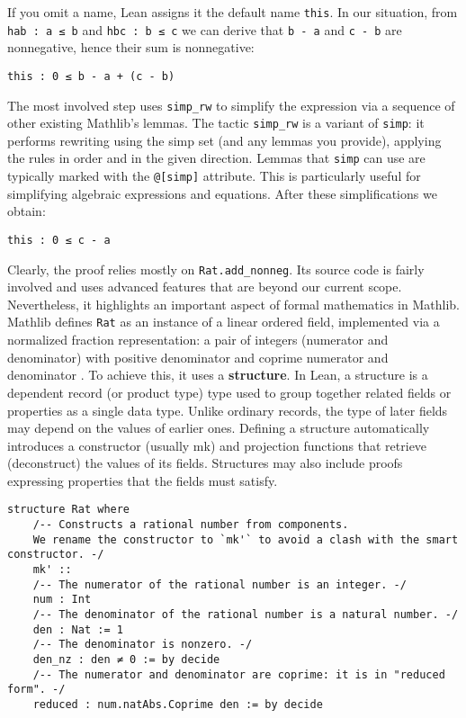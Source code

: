 If you omit a name, Lean assigns it the default name \lstinline[language=lean]|this|.
In our situation, from \lstinline[language=lean]|hab : a ≤ b| and \lstinline[language=lean]|hbc : b ≤ c|
we can derive that \lstinline[language=lean]|b - a| and \lstinline[language=lean]|c - b|
are nonnegative, hence their sum is nonnegative:
\begin{lstlisting}[language=lean]
  this : 0 ≤ b - a + (c - b)
\end{lstlisting}
The most involved step uses \lstinline[language=lean]|simp_rw| to
simplify the expression via a sequence of other existing Mathlib's lemmas.
The tactic \lstinline[language=lean]|simp_rw| is a variant of \lstinline[language=lean]|simp|:
it performs rewriting using the simp set (and any lemmas you provide), applying the rules
in order and in the given direction. Lemmas that \lstinline[language=lean]|simp| can use
are typically marked with the \lstinline[language=lean]|@[simp]| attribute.
This is particularly useful for simplifying algebraic expressions and equations.
After these simplifications we obtain:
\begin{lstlisting}[language=lean]
  this : 0 ≤ c - a
\end{lstlisting}
Clearly, the proof relies mostly on \lstinline[language=lean]|Rat.add_nonneg|.
Its source code is fairly involved and uses advanced features
that are beyond our current scope. Nevertheless, it highlights
an important aspect of formal mathematics in Mathlib.
Mathlib defines \lstinline[language=lean]|Rat| as an instance of
a linear ordered field, implemented via a normalized fraction
representation: a pair of integers (numerator and denominator)
with positive denominator and coprime numerator and denominator \cite{mathlibdoc}.
To achieve this, it uses a \textbf{structure}. In Lean, a structure is a dependent record
(or product type) type  used to group together related fields or properties as a single data type.
Unlike ordinary records, the type of later fields may depend on the values of earlier ones.
Defining a structure automatically introduces a constructor (usually mk) and projection
functions that retrieve (deconstruct) the values of its fields.
Structures may also include proofs expressing properties that the fields must satisfy.
\newpage
\begin{lstlisting}[language=lean]
  structure Rat where
    /-- Constructs a rational number from components.
    We rename the constructor to `mk'` to avoid a clash with the smart constructor. -/
    mk' ::
    /-- The numerator of the rational number is an integer. -/
    num : Int
    /-- The denominator of the rational number is a natural number. -/
    den : Nat := 1
    /-- The denominator is nonzero. -/
    den_nz : den ≠ 0 := by decide
    /-- The numerator and denominator are coprime: it is in "reduced form". -/
    reduced : num.natAbs.Coprime den := by decide
\end{lstlisting}
